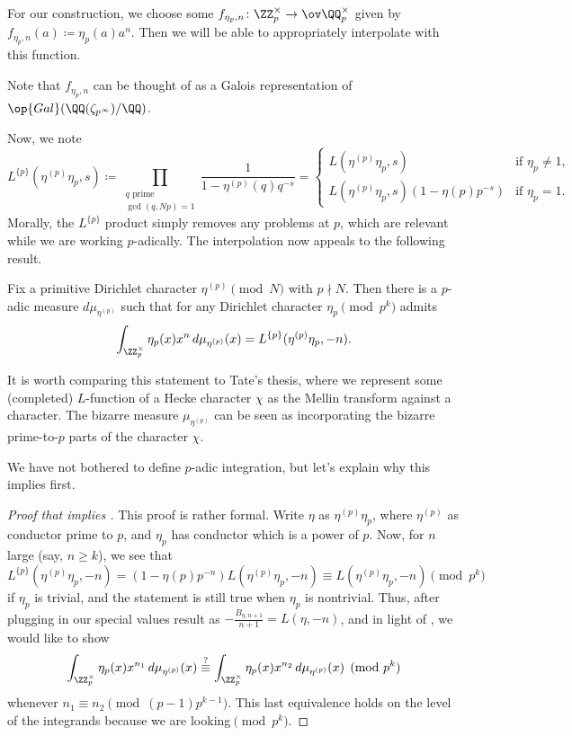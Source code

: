 \documentclass{article}
\begin{document}
For our construction, we choose some $f_{\eta_p,n}\colon\ZZ_p^\times\to\ov\QQ_p^\times$ given by $f_{\eta_p,n}(a)\coloneqq\eta_p(a)a^n$. Then we will be able to appropriately interpolate with this function.
\begin{remark}
	Note that $f_{\eta_p,n}$ can be thought of as a Galois representation of $\op{Gal}(\QQ(\zeta_{p^\infty})/\QQ)$.
\end{remark}
Now, we note
\[L^{\{p\}}\left(\eta^{(p)}\eta_p,s\right)\coloneqq\prod_{\substack{q\text{ prime}\\\gcd(q,Np)=1}}\frac1{1-\eta^{(p)}(q)q^{-s}}=\begin{cases}
	L\left(\eta^{(p)}\eta_p,s\right) & \text{if }\eta_p\ne1, \\
	L\left(\eta^{(p)}\eta_p,s\right)\left(1-\eta(p)p^{-s}\right) & \text{if }\eta_p=1.
\end{cases}\]
Morally, the $L^{\{p\}}$ product simply removes any problems at $p$, which are relevant while we are working $p$-adically. The interpolation now appeals to the following result.
\begin{theorem} \label{thm:construct-p-adic-l-func}
	Fix a primitive Dirichlet character $\eta^{(p)}\pmod N$ with $p\nmid N$. Then there is a $p$-adic measure $d\mu_{\eta^{(p)}}$ such that for any Dirichlet character $\eta_p\pmod{p^k}$ admits
	\[\int_{\ZZ_p^\times}\eta_p(x)x^n\,d\mu_{\eta^{(p)}}(x)=L^{\{p\}}(\eta^{(p)}\eta_p,-n).\]
\end{theorem}
\begin{remark} \label{rem:p-adic-tate-thesis}
	It is worth comparing this statement to Tate's thesis, where we represent some (completed) $L$-function of a Hecke character $\chi$ as the Mellin transform against a character. The bizarre measure $\mu_{\eta^{(p)}}$ can be seen as incorporating the bizarre prime-to-$p$ parts of the character $\chi$.
\end{remark}
We have not bothered to define $p$-adic integration, but let's explain why this implies  first.
\begin{proof}[Proof that  implies ]
	This proof is rather formal. Write $\eta$ as $\eta^{(p)}\eta_p$, where $\eta^{(p)}$ as conductor prime to $p$, and $\eta_p$ has conductor which is a power of $p$. Now, for $n$ large (say, $n\ge k$), we see that
	\[L^{\{p\}}\left(\eta^{(p)}\eta_p,-n\right)=\left(1-\eta(p)p^{-n}\right)L\left(\eta^{(p)}\eta_p,-n\right)\equiv L\left(\eta^{(p)}\eta_p,-n\right)\pmod{p^k}\]
	if $\eta_p$ is trivial, and the statement is still true when $\eta_p$ is nontrivial. Thus, after plugging in our special values result as $-\frac{B_{\eta,n+1}}{n+1}=L(\eta,-n)$, and in light of , we would like to show
	\[\int_{\ZZ_p^\times}\eta_p(x)x^{n_1}\,d\mu_{\eta^{(p)}}(x)\stackrel?\equiv\int_{\ZZ_p^\times}\eta_p(x)x^{n_2}\,d\mu_{\eta^{(p)}}(x)\pmod{p^k}\]
	whenever $n_1\equiv n_2\pmod{(p-1)p^{k-1}}$. This last equivalence holds on the level of the integrands because we are looking$\pmod{p^k}$.
\end{proof}
\end{document}
